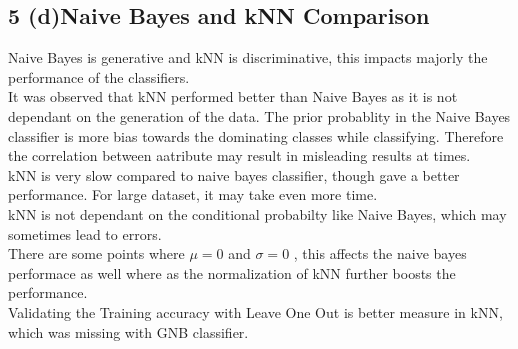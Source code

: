 \documentclass[10pt,letterpaper]{article}
\begin{document}
\subsection{5 (d)Naive Bayes and kNN Comparison}
Naive Bayes is generative and kNN is discriminative, this impacts majorly the performance of the classifiers.\\
It was observed that kNN performed better than Naive Bayes as it is not dependant on the generation of the data.
The prior probablity in the Naive Bayes classifier is more bias towards the dominating classes while classifying. Therefore the correlation between aatribute may result in misleading results at times.\\
kNN is very slow compared to naive bayes classifier, though gave a better performance. For large dataset, it may take even more time.\\
 kNN is not dependant on the conditional probabilty like Naive Bayes, which may sometimes lead to errors.\\
There are some points where $\mu =0$ and $\sigma =0$ , this affects the naive bayes performace as well where as the normalization of kNN further boosts the performance.\\
Validating the Training accuracy with Leave One Out is better measure in kNN, which was missing with GNB classifier.\\
\end{document}
